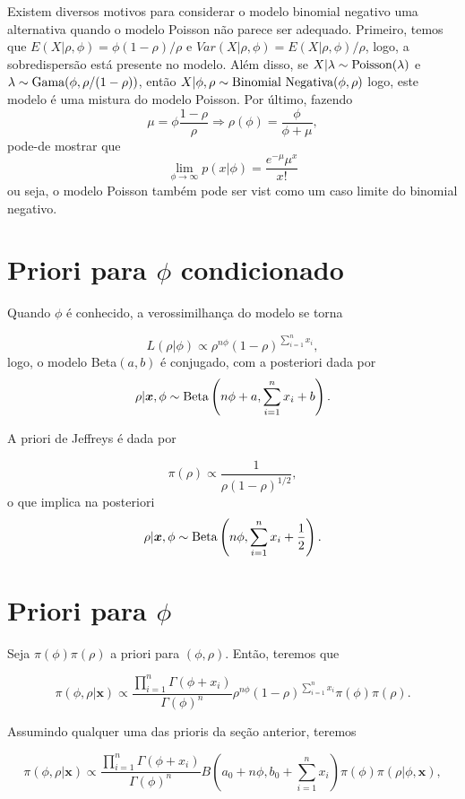 \documentclass[
  letterpaper,
  DIV=11,
  numbers=noendperiod]{scrreprt}
\theoremstyle{definition}
\theoremstyle{plain}
\theoremstyle{definition}
\theoremstyle{remark}
\begin{document}
Existem diversos motivos para considerar o modelo binomial negativo uma
alternativa quando o modelo Poisson não parece ser adequado. Primeiro,
temos que \(E(X|\rho,\phi)=\phi(1-\rho)/\rho\) e
\(Var(X|\rho,\phi)=E(X|\rho,\phi)/\rho\), logo, a sobredispersão está
presente no modelo. Além disso, se
\(X|\lambda\sim\hbox{Poisson}(\lambda)\) e
\(\lambda\sim\hbox{Gama}(\phi, \rho/(1-\rho))\), então
\(X|\phi,\rho\sim\hbox{Binomial Negativa}(\phi,\rho)\) logo, este modelo
é uma mistura do modelo Poisson. Por último, fazendo
\[\mu=\phi\frac{1-\rho}{\rho}\Rightarrow \rho(\phi)=\frac{\phi}{\phi+\mu},\]
pode-de mostrar que
\[\lim_{\phi\rightarrow\infty}p(x|\phi)=\frac{e^{-\mu}\mu^x}{x!}\] ou
seja, o modelo Poisson também pode ser vist como um caso limite do
binomial negativo.

\section{\texorpdfstring{Priori para \(\phi\)
condicionado}{Priori para \textbackslash phi condicionado}}\label{priori-para-phi-condicionado}

Quando \(\phi\) é conhecido, a verossimilhança do modelo se torna

\[L(\rho|\phi)\propto \rho^{n\phi}(1-\rho)^{\sum_{i=1}^n x_i},\] logo, o
modelo Beta\((a,b)\) é conjugado, com a posteriori dada por
\[\rho|\boldsymbol{x},\phi\sim\hbox{Beta}\left(n\phi+a,\sum_{i=1}^n x_i+b\right).\]

A priori de Jeffreys é dada por

\[\pi(\rho)\propto \frac{1}{\rho(1-\rho)^{1/2}},\] o que implica na
posteriori
\[\rho|\boldsymbol{x},\phi\sim\hbox{Beta}\left(n\phi,\sum_{i=1}^n x_i+\frac{1}{2}\right).\]

\section{\texorpdfstring{Priori para
\(\phi\)}{Priori para \textbackslash phi}}\label{priori-para-phi}

Seja \(\pi(\phi)\pi(\rho)\) a priori para \((\phi,\rho)\). Então,
teremos que

\[\pi(\phi,\rho|\boldsymbol{x})\propto \frac{\prod_{i=1}^n\Gamma(\phi+x_i)}{\Gamma(\phi)^n}\rho^{n\phi}(1-\rho)^{\sum_{i=1}^n x_i}\pi(\phi)\pi(\rho).\]

Assumindo qualquer uma das prioris da seção anterior, teremos

\[\pi(\phi,\rho|\boldsymbol{x})\propto \frac{\prod_{i=1}^n\Gamma(\phi+x_i)}{\Gamma(\phi)^n}B\left(a_0+n\phi,b_0+\sum_{i=1}^nx_i\right)\pi(\phi)\pi(\rho|\phi,\boldsymbol{x}),\]
\end{document}

